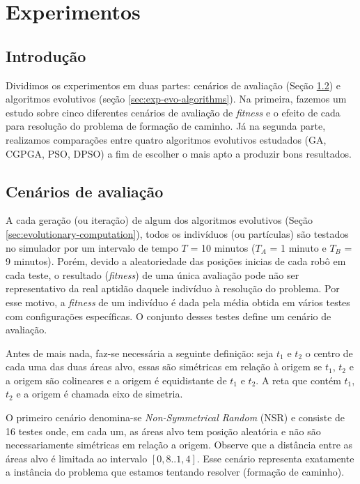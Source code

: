 \chapter{Experimentos}
\label{cha:experiments}

\section{Introdução}

Dividimos os experimentos em duas partes: cenários de avaliação (Seção \ref{sec:evaluation-scenarios}) e algoritmos evolutivos (seção \ref{sec:exp-evo-algorithms}). Na primeira, fazemos um estudo sobre cinco diferentes cenários de avaliação de \textit{fitness} e o efeito de cada para resolução do problema de formação de caminho. Já na segunda parte, realizamos comparações entre quatro algoritmos evolutivos estudados (GA, CGPGA, PSO, DPSO) a fim de escolher o mais apto a produzir bons resultados.

\section{Cenários de avaliação}
\label{sec:evaluation-scenarios}

A cada geração (ou iteração) de algum dos algoritmos evolutivos (Seção \ref{sec:evolutionary-computation}), todos os indivíduos (ou partículas) são testados no simulador por um intervalo de tempo $T$ = 10 minutos ($T_{A}$ = 1 minuto e $T_{B}$ = 9 minutos). Porém, devido a aleatoriedade das posições inicias de cada robô em cada teste, o resultado (\textit{fitness}) de uma única avaliação pode não ser representativo da real aptidão daquele indivíduo à resolução do problema. Por esse motivo, a \textit{fitness} de um indivíduo é dada pela média obtida em vários testes com configurações específicas. O conjunto desses testes define um cenário de avaliação.

Antes de mais nada, faz-se necessária a seguinte definição: seja $t_{1}$ e $t_{2}$ o centro de cada uma das duas áreas alvo, essas são simétricas em relação à origem se $t_{1}$, $t_{2}$ e a origem são colineares e a origem é equidistante de $t_{1}$ e $t_{2}$. A reta que contém $t_{1}$, $t_{2}$ e a origem é chamada eixo de simetria.

O primeiro cenário denomina-se \textit{Non-Symmetrical Random} (NSR) e consiste de 16 testes onde, em cada um, as áreas alvo tem posição aleatória e não são necessariamente simétricas em relação a origem. Observe que a distância entre as áreas alvo é limitada ao intervalo $[0,8..1,4]$. Esse cenário representa exatamente a instância do problema que estamos tentando resolver (formação de caminho).

